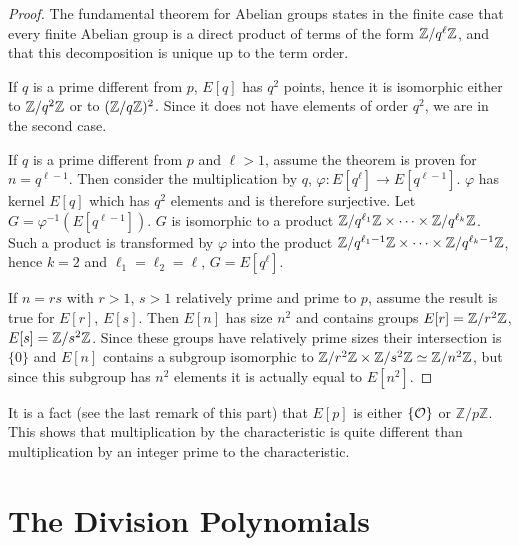 \begin{proof}
The fundamental theorem for Abelian groups states in the finite case that every finite Abelian group is a direct product of terms of the form $\mathbb{Z} / q^{\ell} \mathbb{Z}$, and that this decomposition is unique up to the term order.

If $q$ is a prime different from $p$, $E[q]$ has $q^2$ points, hence it is isomorphic either to $\mathbb{Z}/q^2 \mathbb{Z}$ or to $(\mathbb{Z} /q \mathbb{Z})^2$. Since it does not have elements of order $q^2$, we are in the second case.

If $q$ is a prime different from $p$ and $\ell > 1$, assume the theorem is proven for $n = q^{\ell-1}$. Then consider the multiplication by $q$, $\varphi: E[q^{\ell}] \to E[q^{\ell - 1}]$. $\varphi$ has kernel $E[q]$ which has $q^2$ elements and is therefore surjective. Let $G = \varphi^{-1}(E[q^{\ell-1}])$. 
$G$ is isomorphic to a product $\mathbb{Z} / q^{\ell_1} \mathbb{Z} \times \cdots \times \mathbb{Z} / q^{\ell_k} \mathbb{Z}$. Such a product is transformed by $\varphi$ into the product $\mathbb{Z} / q^{\ell_1-1} \mathbb{Z} \times \cdots \times \mathbb{Z} / q^{\ell_k-1} \mathbb{Z}$, hence $k=2$ and $\ell_1 = \ell_2 = \ell$, $G=E[q^{\ell}]$.

If $n=rs$ with $r>1$, $s>1$ relatively prime and prime to $p$, assume the result is true for $E[r]$, $E[s]$. Then $E[n]$ has size $n^2$ and contains groups $E[r] = \mathbb{Z}/r^2\mathbb{Z}$, $E[s]=\mathbb{Z}/s^2\mathbb{Z}$. Since these groups have relatively prime sizes their intersection is $\{0\}$ and $E[n]$ contains a subgroup isomorphic to $\mathbb{Z}/r^2\mathbb{Z} \times \mathbb{Z}/s^2\mathbb{Z} \simeq \mathbb{Z}/n^2\mathbb{Z}$, but since this subgroup has $n^2$ elements it is actually equal to $E[n^2]$.
   

\end{proof}

\rem
It is a fact (see the last remark of this part) that $E[p]$ is either $\{\mathcal{O}\}$ or $\mathbb{Z}/p\mathbb{Z}$. This shows that multiplication by the characteristic is quite different than multiplication by an integer prime to the characteristic.

\section{The Division Polynomials}

